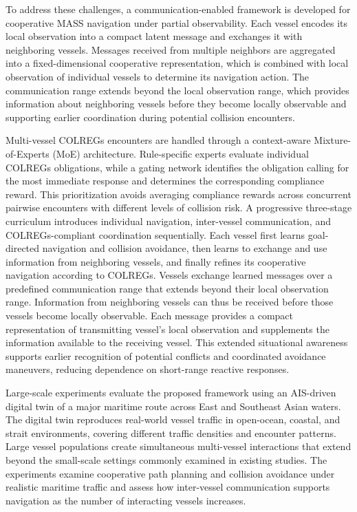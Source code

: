 \documentclass[final,5p,times,twocolumn]{elsarticle}
\begin{document}
{To address these challenges, a communication-enabled framework is developed for cooperative MASS navigation under partial observability. Each vessel encodes its local observation into a compact latent message and exchanges it with neighboring vessels. Messages received from multiple neighbors are aggregated into a fixed-dimensional cooperative representation, which is combined with local observation of individual vessels to determine its navigation action. The communication range extends beyond the local observation range, which provides information about neighboring vessels before they become locally observable and supporting earlier coordination during potential collision encounters.

Multi-vessel COLREGs encounters are handled through a context-aware Mixture-of-Experts (MoE) architecture. Rule-specific experts evaluate individual COLREGs obligations, while a gating network identifies the obligation calling for the most immediate response and determines the corresponding compliance reward. This prioritization avoids averaging compliance rewards across concurrent pairwise encounters with different levels of collision risk. A progressive three-stage curriculum introduces individual navigation, inter-vessel communication, and COLREGs-compliant coordination sequentially. Each vessel first learns goal-directed navigation and collision avoidance, then learns to exchange and use information from neighboring vessels, and finally refines its cooperative navigation according to COLREGs.
Vessels exchange learned messages over a predefined communication range that extends beyond their local observation range. Information from neighboring vessels can thus be received before those vessels become locally observable. Each message provides a compact representation of transmitting vessel's local observation and supplements the information available to the receiving vessel. This extended situational awareness supports earlier recognition of potential conflicts and coordinated avoidance maneuvers, reducing dependence on short-range reactive responses.

Large-scale experiments evaluate the proposed framework using an AIS-driven digital twin of a major maritime route across East and Southeast Asian waters. The digital twin reproduces real-world vessel traffic in open-ocean, coastal, and strait environments, covering different traffic densities and encounter patterns. Large vessel populations create simultaneous multi-vessel interactions that extend beyond the small-scale settings commonly examined in existing studies. The experiments examine cooperative path planning and collision avoidance under realistic maritime traffic and assess how inter-vessel communication supports navigation as the number of interacting vessels increases.


}
\end{document}
